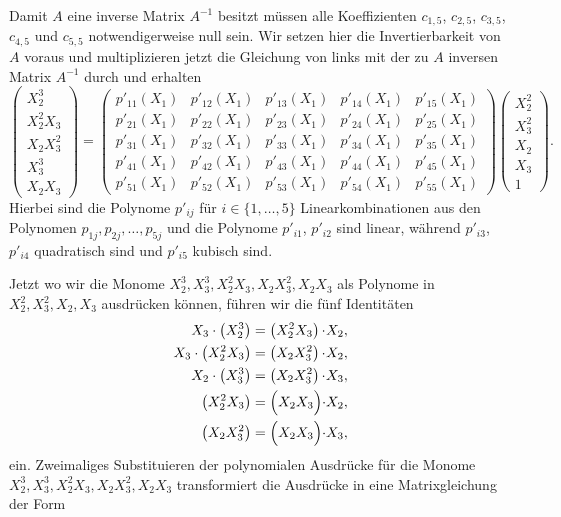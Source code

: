 \documentclass[a4paper,oneside, 11pt, openany%
]{article}
\theoremstyle{custom}
\theoremstyle{custom}
\begin{document}
Damit $A$ eine inverse Matrix $A^{-1}$ besitzt müssen alle Koeffizienten $c_{1,5}$, $c_{2,5}$,  $c_{3,5}$, $c_{4,5}$ und $c_{5,5}$ notwendigerweise null sein.
Wir setzen hier die Invertierbarkeit von $A$ voraus und multiplizieren jetzt die Gleichung von links mit der zu $A$ inversen Matrix $A^{-1}$ durch und erhalten
\begin{equation*}
	\begin{pmatrix}
		X_{2}^3\\
		X_{2}^2X_{3}\\
		X_{2}X_{3}^2\\
		X_{3}^3\\
		X_{2}X_{3}
	\end{pmatrix}
	=
	\begin{pmatrix}
		p'_{11}(X_{1})&p'_{12}(X_{1})& p'_{13}(X_{1})& p'_{14}(X_{1})& p'_{15}(X_{1})\\
		p'_{21}(X_{1})&p'_{22}(X_{1})& p'_{23}(X_{1})& p'_{24}(X_{1})& p'_{25}(X_{1})\\
		p'_{31}(X_{1})&p'_{32}(X_{1})& p'_{33}(X_{1})& p'_{34}(X_{1})& p'_{35}(X_{1})\\
		p'_{41}(X_{1})&p'_{42}(X_{1})& p'_{43}(X_{1})& p'_{44}(X_{1})& p'_{45}(X_{1})\\
		p'_{51}(X_{1})&p'_{52}(X_{1})& p'_{53}(X_{1})& p'_{54}(X_{1})& p'_{55}(X_{1})
	\end{pmatrix}
	\begin{pmatrix}
		X_{2}^2\\
		X_{3}^2\\
		X_{2}\\
		X_{3}\\
		1
	\end{pmatrix}.
\end{equation*}
Hierbei sind die Polynome $p'_{ij}$ für $i \in \{1,\ldots,5\}$ Linearkombinationen aus den Polynomen $p_{1j},p_{2j},\ldots,p_{5j}$ und die Polynome $p'_{i1}$, $p'_{i2}$ sind linear, während $p'_{i3}$, $p'_{i4}$ quadratisch sind und $p'_{i5}$ kubisch sind.

Jetzt wo wir die Monome $X_{2}^3,X_{3}^3,X_{2}^2X_{3},X_{2}X_{3}^2,X_{2}X_{3}$ als Polynome in \newline $X_{2}^2,X_{3}^2,X_{2},X_{3}$ ausdrücken können, führen wir die fünf Identitäten
\begin{gather}
	\begin{alignedat}{2}
		X_{3} \cdot \left( X_{2}^{3}\right)  &= \left( X_{2}^{2}X_{3}\right) \cdot& X_{2},\\
		X_{3}\cdot \left(X_{2}^{2}X_{3}\right) &= \left(X_{2}X_{3}^{2}\right) \cdot& X_{2},\\
		X_{2}\cdot\left( X_{3}^{3}\right) &= \left(X_{2}X_{3}^{2}\right) \cdot& X_{3},\\
		\left(X_{2}^{2}X_{3}\right)  &= \Bigl(X_{2}X_{3}\Bigr) \cdot& X_{2},\\
		\left(X_{2}X_{3}^{2}\right)  &= \Bigl(X_{2}X_{3}\Bigr) \cdot& X_{3},\\
	\end{alignedat}
\end{gather}
ein. 
Zweimaliges Substituieren der polynomialen Ausdrücke für die Monome $X_{2}^3,X_{3}^3,X_{2}^2X_{3},X_{2}X_{3}^2,X_{2}X_{3}$ transformiert die Ausdrücke in eine Matrixgleichung der Form
\end{document}
